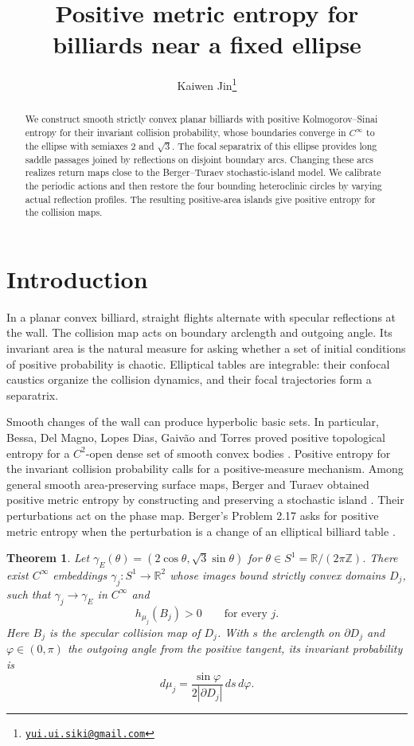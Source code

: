 \documentclass[11pt]{article}
\title{Positive metric entropy for billiards near a fixed ellipse}
\author{Kaiwen Jin\thanks{\href{mailto:yui.ui.siki@gmail.com}{\texttt{yui.ui.siki@gmail.com}}}}
\date{}
\newtheorem{theorem}{Theorem}
\begin{document}
\maketitle

\begin{abstract}
We construct smooth strictly convex planar billiards with positive
Kolmogorov--Sinai entropy for their invariant collision probability,
whose boundaries converge in \(C^\infty\) to the ellipse with semiaxes
\(2\) and \(\sqrt{3}\). The focal separatrix of this ellipse provides long
saddle passages joined by reflections on disjoint boundary arcs.
Changing these arcs realizes return maps close to the Berger--Turaev
stochastic-island model. We calibrate the periodic actions and then
restore the four bounding heteroclinic circles by varying actual
reflection profiles. The resulting positive-area islands give positive
entropy for the collision maps.
\end{abstract}

\section{Introduction}

In a planar convex billiard, straight flights alternate with specular
reflections at the wall. The collision map acts on boundary arclength and
outgoing angle. Its invariant area is the natural measure for asking
whether a set of initial conditions of positive probability is chaotic.
Elliptical tables are integrable: their confocal caustics organize the
collision dynamics, and their focal trajectories form a separatrix.

Smooth changes of the wall can produce hyperbolic basic sets. In particular,
Bessa, Del Magno, Lopes Dias, Gaiv\~ao and Torres proved positive topological
entropy for a \(C^2\)-open dense set of smooth convex bodies
\cite[Theorem 1.1 and Corollary 1.2]{Bessa}. Positive entropy for the
invariant collision probability calls for a positive-measure mechanism.
Among general smooth area-preserving surface maps, Berger and Turaev
obtained positive metric entropy by constructing and preserving a
stochastic island \cite[Theorem A]{BT}. Their perturbations act on the
phase map. Berger's Problem 2.17 asks for positive metric entropy when
the perturbation is a change of an elliptical billiard table
\cite[\S2.3]{BergerICM}.

\begin{theorem}\label{thm:main}
Let \(\gamma_E(\theta)=(2\cos\theta,\sqrt{3}\sin\theta)\) for
\(\theta\in S^1=\mathbb R/(2\pi\mathbb Z)\).
There exist \(C^\infty\) embeddings \(\gamma_j:S^1\to\mathbb R^2\) whose
images bound strictly convex domains \(D_j\), such that
\(\gamma_j\to\gamma_E\) in \(C^\infty\) and
\[
 h_{\mu_j}(B_j)>0\qquad\text{for every }j.
\]
Here \(B_j\) is the specular collision map of \(D_j\). With \(s\) the
arclength on \(\partial D_j\) and \(\varphi\in(0,\pi)\) the outgoing angle
from the positive tangent, its invariant probability is
\[
 d\mu_j=\frac{\sin\varphi}{2|\partial D_j|}\,ds\,d\varphi .
\]
\end{theorem}
\end{document}
